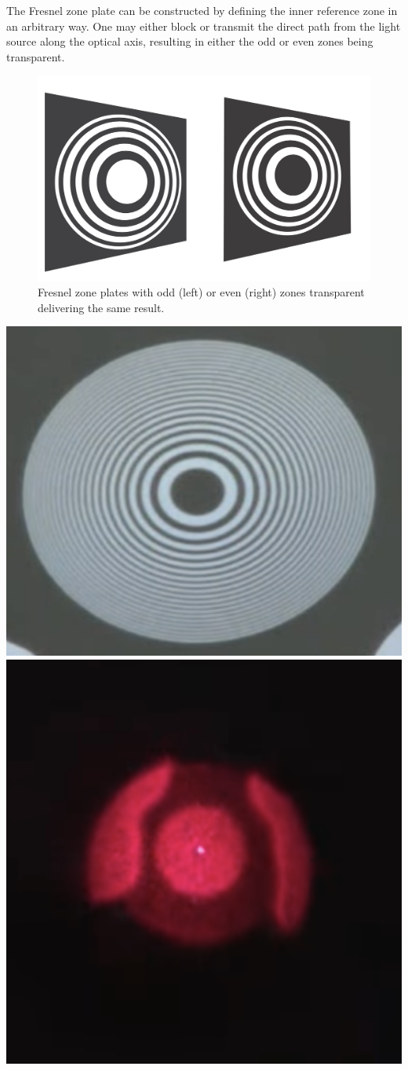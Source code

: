 \documentclass[
  a4paper,
]{book}
\begin{document}
The Fresnel zone plate can be constructed by defining the inner
reference zone in an arbitrary way. One may either block or transmit the
direct path from the light source along the optical axis, resulting in
either the odd or even zones being transparent.

\begin{figure}[H]

{\centering \includegraphics[width=0.9\linewidth,height=\textheight,keepaspectratio]{wave-optics/img/odd_even_zones.png}

}

\caption{Fresnel zone plates with odd (left) or even (right) zones
transparent delivering the same result.}

\end{figure}%

\includegraphics[width=0.49\linewidth,height=\textheight,keepaspectratio]{wave-optics/img/zone_plate_lecture.png}
\includegraphics[width=0.4\linewidth,height=\textheight,keepaspectratio]{wave-optics/img/zone_plate_lecture_image.png}
\end{document}
